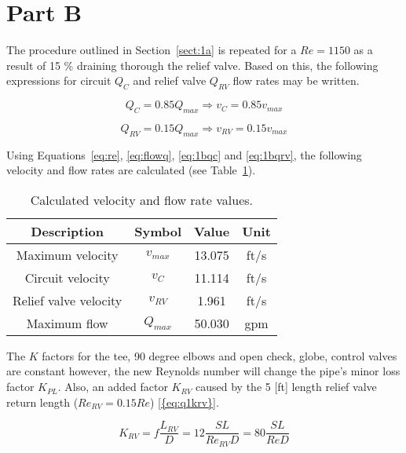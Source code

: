 \section{Part B}
\label{sect:1b}

The procedure outlined in Section~\ref{sect:1a} is repeated for a $Re = 1150$ as a result of 15 \% draining thorough the relief valve. Based on this, the following expressions for circuit $Q_C$ and relief valve $Q_{RV}$  flow rates may be written.

\begin{equation}
	\label{eq:1bqc}
	Q_C = 0.85 Q_{max} \Rightarrow v_C = 0.85 v_{max}
\end{equation}

\begin{equation}
	\label{eq:1bqrv}
	Q_{RV} = 0.15 Q_{max} \Rightarrow v_{RV} = 0.15 v_{max}
\end{equation}

Using Equations~\ref{eq:re}, \ref{eq:flowq}, \ref{eq:1bqc} and \ref{eq:1bqrv}, the following velocity and flow rates are calculated (see Table~\ref{tab:q2flow}).

\begin{table}[H]
  \centering
  \caption{Calculated velocity and flow rate values.}
    \begin{tabular}{cccc}
    \toprule
    \textbf{Description} & \textbf{Symbol} & \textbf{Value } & \textbf{Unit} \\
    \midrule
    Maximum velocity & $v_{max}$ & 13.075 & ft/s \\
    Circuit velocity & $v_C$   & 11.114 &  ft/s  \\
    Relief valve velocity & $v_{RV}$  & 1.961 &  ft/s  \\
	Maximum flow & $Q_{max}$ & 50.030 & gpm \\
    \bottomrule
    \end{tabular}
  \label{tab:q2flow}
\end{table}

The $K$ factors for the tee, 90 degree elbows and open check, globe, control valves are constant however, the new Reynolds number will change the pipe's minor loss factor $K_{PL}$. Also, an added factor $K_{RV}$ caused by the 5 [ft] length relief valve return length ($Re_{RV}= 0.15 Re$) \ref{{eq:q1krv}}.

\begin{equation}
	\label{eq:q1krv}	
	K_{RV} = f \frac{L_{RV}}{D} = 12 \frac{SL}{Re_{RV} D} = 80 \frac{SL}{Re D} 
\end{equation}

